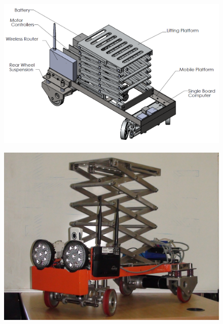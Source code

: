 \begin{figure}[h]
	\centering
	\includegraphics[width=\linewidth,keepaspectratio]{Chapter3/fig/robo3Dmodel}
	\label{fig:robo3Dmodel}
\end{figure}
\begin{figure}[h]
 		\centering
		\includegraphics[width=.8\linewidth,keepaspectratio]{Chapter3/fig/roboActual}
		\label{fig:roboActual}
\end{figure}


